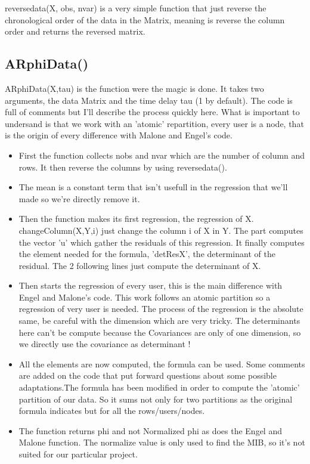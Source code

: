 \documentclass{report}
\begin{document}
reversedata(X, obs, nvar) is a very simple function that just reverse the chronological order of the data in the Matrix, meaning is reverse the column order and returns the reversed matrix.

\subsection{ARphiData()}

ARphiData(X,tau) is the function were the magic is done. It takes two arguments, the data Matrix and the time delay tau (1 by default). The code is full of comments but I'll describe the process quickly here. What is important to undersand is that we work with an 'atomic' repartition, every user is a node, that is the origin of every difference with Malone and Engel's code.

\begin{itemize}
\item First the function collects nobs and nvar which are the number of column and rows. It then reverse the columns by using reversedata().
\item The mean is a constant term that isn't usefull in the regression that we'll made so we're directly remove it.
\item Then the function makes its first regression, the regression of X. changeColumn(X,Y,i) just change the column i of X in Y. The part computes the vector 'u' which gather the residuals of this regression. It finally computes the element needed for the formula, 'detResX', the determinant of the residual. The 2 following lines just compute the determinant of X.
\item Then starts the regression of every user, this is the main difference with Engel and Malone's code. This work follows an atomic partition so a regression of very user is needed. The process of the regression is the absolute same, be careful with the dimension which are very tricky. The determinants here can't be compute because the Covariances are only of one dimension, so we directly use the covariance as determinant ! 
\item All the elements are now computed, the formula can be used. Some comments are added on the code that put forward questions about some possible adaptations.The formula has been modified in order to compute the 'atomic' partition of our data. So it sums not only for two partitions as the original formula indicates but for all the rows/users/nodes.
\item The function returns phi and not Normalized phi as does the Engel and Malone function. The normalize value is only used to find the MIB, so it's not suited for our particular project.
\end{itemize}
\end{document}
